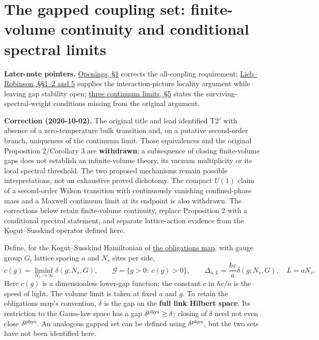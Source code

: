 \documentclass[11pt,a4paper]{article}
\begin{document}
\section{The gapped coupling set: finite-volume continuity and
conditional spectral
limits}\label{the-gapped-coupling-set-finite-volume-continuity-and-conditional-spectral-limits}

\textbf{Later-note pointers.} \href{mass-gap-openings.md}{Openings, §1}
corrects the all-coupling requirement;
\href{lieb-robinson-kogut-susskind.md}{Lieb--Robinson, §§1--2 and 5}
supplies the interaction-picture locality argument while leaving gap
stability open; \href{three-continuum-limits.md}{three continuum limits,
§5} states the surviving-spectral-weight conditions missing from the
original argument.

\textbf{Correction (2026-10-02).} The original title and lead identified
T2\('\) with absence of a zero-temperature bulk transition and, on a
putative second-order branch, uniqueness of the continuum limit. Those
equivalences and the original Proposition 2/Corollary 3 are
\textbf{withdrawn}: a subsequence of closing finite-volume gaps does not
establish an infinite-volume theory, its vacuum multiplicity or its
local spectral threshold. The two proposed mechanisms remain possible
interpretations, not an exhaustive proved dichotomy. The compact
\(U(1)\) claim of a second-order Wilson transition with continuously
vanishing confined-phase mass and a Maxwell continuum limit at its
endpoint is also withdrawn. The corrections below retain finite-volume
continuity, replace Proposition 2 with a conditional spectral statement,
and separate lattice-action evidence from the Kogut--Susskind operator
defined here.

Define, for the Kogut--Susskind Hamiltonian of
\href{mass-gap-obligations-lattice.md}{the obligations map}, with gauge
group \(G\), lattice spacing \(a\) and \(N_s\) sites per side,
\[c(g)=\liminf_{N_s\to\infty}\delta(g;N_s,G),\qquad
\mathcal G=\{g>0:\ c(g)>0\},\qquad
\Delta_{a,L}=\frac{\hbar c}{a}\delta(g;N_s,G),\quad L=aN_s.\] Here
\(c(g)\) is a dimensionless lower-gap function; the constant \(c\) in
\(\hbar c/a\) is the speed of light. The volume limit is taken at fixed
\(a\) and \(g\). To retain the obligations map's convention, \(\delta\)
is the gap on the \textbf{full link Hilbert space}. Its restriction to
the Gauss-law space has a gap \(\delta^{\rm phys}\ge\delta\); closing of
\(\delta\) need not even close \(\delta^{\rm phys}\). An analogous
gapped set can be defined using \(\delta^{\rm phys}\), but the two sets
have not been identified here.
\end{document}
